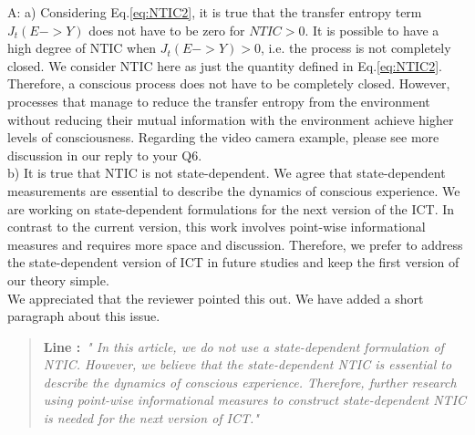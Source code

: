 \documentclass[utf8]{article}
\newenvironment{ans}  
    {\color{Black}\noindent A:}
    {~\newline}
\newcommand{\addnew}[2]{\blockcquote{}{\textbf{Line #1:}~\newline\textit{"#2"}}
}
\begin{document}
    	\begin{ans}
    		\newline
    		a) Considering Eq.\ref{eq:NTIC2}, it is true that the transfer entropy term $J_t(E -> Y)$ does not have to be zero for $NTIC>0$. It is possible to have a high degree of NTIC when $J_t(E -> Y) > 0$, i.e. the process is not completely closed. We consider NTIC here as just the quantity defined in Eq.\ref{eq:NTIC2}.   \\
            Therefore, a conscious process does not have to be completely closed. 
            However, processes that manage to reduce the transfer entropy from the environment without reducing their mutual information with the environment achieve 
            higher levels of consciousness. 
            Regarding the video camera example, please see more discussion in our reply to your Q6. \\
    		
    		\noindent
    		b) It is true that NTIC is not state-dependent. We agree that state-dependent measurements are essential to describe the dynamics of conscious experience. We are  working on state-dependent formulations for the next version of the ICT. In contrast to the current version, this work involves point-wise informational measures and requires more space and discussion. Therefore, we prefer to address the state-dependent version of ICT in future studies and keep the first version of our theory simple.\\
    		We appreciated that the reviewer pointed this out. We have added a short paragraph about this issue.
    	
	    	\addnew{}{
	    		In this article, we do not use a state-dependent formulation of NTIC. However, we believe that the state-dependent NTIC is essential to describe the dynamics of conscious experience. Therefore, further research using point-wise informational measures to construct state-dependent NTIC is needed for the next version of ICT.}

    	\end{ans}
        
\end{document}

